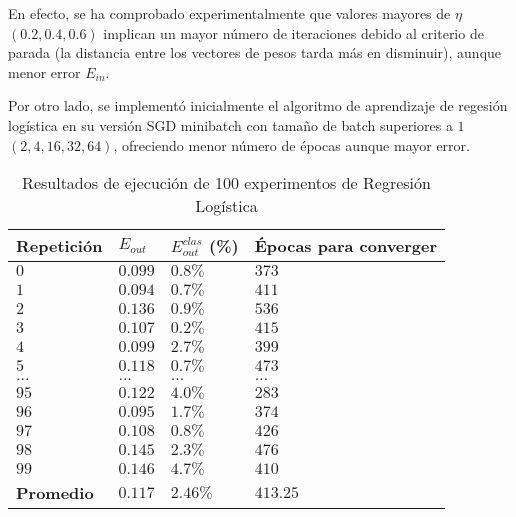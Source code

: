 En efecto, se ha comprobado experimentalmente que valores mayores de $\eta$
$(0.2, 0.4, 0.6)$ implican un mayor número de iteraciones debido al criterio de
parada (la distancia entre los vectores de pesos tarda más en disminuir), aunque
menor error $E_{in}$.

Por otro lado, se implementó inicialmente el algoritmo de aprendizaje de
regesión logística en su versión SGD minibatch con tamaño de batch superiores a $1$
$(2, 4, 16, 32, 64)$, ofreciendo menor número de épocas aunque mayor error.

\begin{table}[H]
    \centering
    \begin{tabular}{llll}
    \toprule
        Repetición & $E_{out}$ & $E_{out}^{clas}$ (\%) & Épocas para converger \\ \midrule
        $0$ & $0.099$ & $0.8 \%$ & $373$ \hfill \\
        $1$ & $0.094$ & $0.7 \%$ & $411$ \hfill\\
        $2$ & $0.136$ & $0.9 \%$ & $536$ \hfill \\
        $3$ & $0.107$ & $0.2 \%$ & $415$ \hfill \\
        $4$ & $0.099$ & $2.7 \%$ & $399$ \hfill \\
        $5$ & $0.118$ & $0.7 \%$ & $473$ \hfill \\
        $\dots$ & $\dots$ & $\dots$ & $\dots$ \hfill \\
        $95$ & $0.122$ & $4.0 \%$ & $283$ \hfill \\
        $96$ & $0.095$ & $1.7 \%$ & $374$ \hfill \\
        $97$ & $0.108$ & $0.8 \%$ & $426$ \hfill \\
        $98$ & $0.145$ & $2.3 \%$ & $476$ \hfill \\
        $99$ & $0.146$ & $4.7 \%$ & $410$ \hfill \\ \bottomrule
        \textbf{Promedio} & \textbf{$0.117$} & \textbf{$2.46 \%$} & \textbf{$413.25$} \\ \bottomrule
    \end{tabular}
    \caption{Resultados de ejecución de 100 experimentos de Regresión Logística}
\end{table}